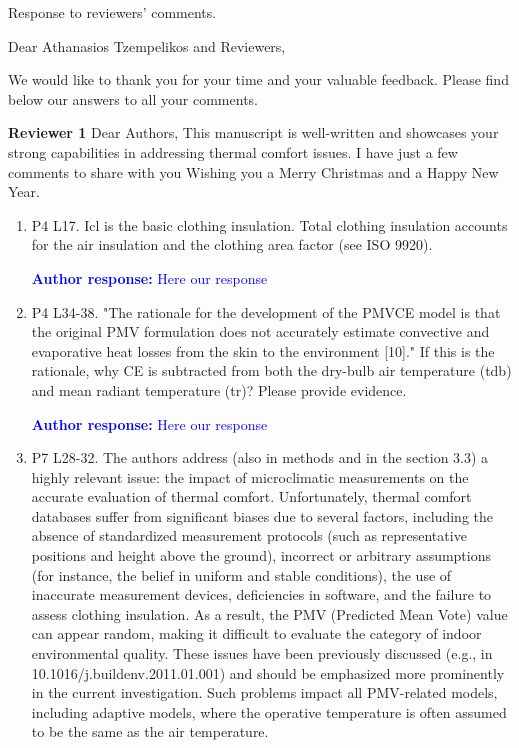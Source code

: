 \documentclass[a4paper, 10pt]{letter}
\newcommand{\response}[1]{\textcolor{blue}{\textbf{Author response:} #1}}
\begin{document}
    \begin{letter}
    {
        Response to reviewers' comments.
    }

        \opening{Dear Athanasios Tzempelikos and Reviewers,}


        We would like to thank you for your time and your valuable feedback.
        Please find below our answers to all your comments.

        \textbf{Reviewer 1}
        Dear Authors,
        This manuscript is well-written and showcases your strong capabilities in addressing thermal comfort issues. 
        I have just a few comments to share with you Wishing you a Merry Christmas and a Happy New Year.

        \begin{enumerate}

            \item P4 L17. Icl is the basic clothing insulation. Total clothing insulation accounts for the air insulation and the clothing area factor (see ISO 9920).
            
            \response{
            Here our response
            }

            \item P4 L34-38. "The rationale for the development of the PMVCE model is that the original PMV
formulation does not accurately estimate convective and evaporative heat losses from
the skin to the environment [10]." If this is the rationale, why CE is subtracted from both
the dry-bulb air temperature (tdb) and mean radiant temperature (tr)? Please provide evidence.

\response{
            Here our response
            }

\item P7 L28-32. The authors address (also in methods and in the section 3.3) a highly relevant issue: the impact of microclimatic measurements on the accurate evaluation of thermal comfort. Unfortunately, thermal comfort databases suffer from significant biases due to several factors, including the absence of standardized measurement protocols (such as representative positions and height above the ground), incorrect or arbitrary assumptions (for instance, the belief in uniform and stable conditions), the use of inaccurate measurement devices, deficiencies in software, and the failure to assess clothing insulation. As a result, the PMV (Predicted Mean Vote) value can appear random, making it difficult to evaluate the category of indoor environmental quality. These issues have been previously discussed (e.g., in 10.1016/j.buildenv.2011.01.001) and should be emphasized more prominently in the current investigation. Such problems impact all PMV-related models, including adaptive models, where the operative temperature is often assumed to be the same as the air temperature.


\end{enumerate}
\end{letter}
\end{document}
